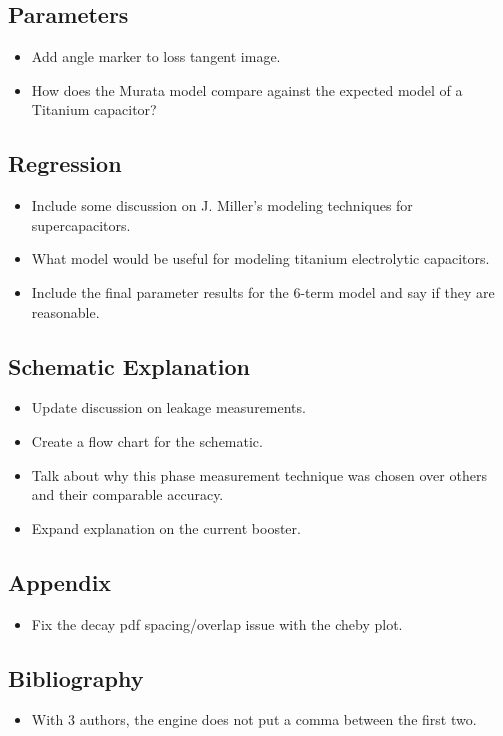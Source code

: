 \documentclass{article}
\begin{document}
\subsection{Parameters}
\begin{itemize}
    \item Add angle marker to loss tangent image.
    \item How does the Murata model compare against the expected model of a Titanium capacitor?
\end{itemize}

\subsection{Regression}
\begin{itemize}
    \item Include some discussion on J. Miller's modeling techniques for supercapacitors.
    \item What model would be useful for modeling titanium electrolytic capacitors.
    \item Include the final parameter results for the 6-term model and say if they are reasonable.
\end{itemize}

\subsection{Schematic Explanation}
\begin{itemize}
    \item Update discussion on leakage measurements.
    \item Create a flow chart for the schematic.
    \item Talk about why this phase measurement technique was chosen over others and their comparable accuracy.
    \item Expand explanation on the current booster.
\end{itemize}

\subsection{Appendix}
\begin{itemize}
    \item Fix the decay pdf spacing/overlap issue with the cheby plot.
\end{itemize}

\subsection{Bibliography}
\begin{itemize}
    \item With 3 authors, the engine does not put a comma between the first two.
\end{itemize}


\end{document}
